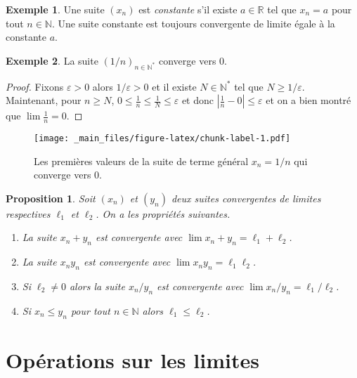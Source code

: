 \documentclass[
]{book}
\providecommand{\tightlist}{%
  \setlength{\itemsep}{0pt}\setlength{\parskip}{0pt}}
\newtheorem{proposition}{Proposition}[chapter]
\theoremstyle{definition}
\theoremstyle{definition}
\newtheorem{example}{Exemple}[chapter]
\theoremstyle{definition}
\theoremstyle{definition}
\theoremstyle{remark}
\begin{document}
\begin{example}
Une suite \((x_n)\) est \emph{constante} s'il existe \(a\in\mathbb{R}\) tel que \(x_n=a\) pour tout \(n\in\mathbb{N}\). Une suite constante est toujours convergente de limite égale à la constante \(a\).
\end{example}

\begin{example}
\protect\hypertarget{exm:harmonique}{}\label{exm:harmonique}La suite \((1/n)_{n\in\mathbb{N}^*}\) converge vers 0.
\end{example}

\begin{proof}
Fixons \(\varepsilon>0\) alors \(1/\varepsilon>0\) et il existe \(N\in\mathbb{N}^*\) tel que \(N\geq 1/\varepsilon\). Maintenant, pour \(n\geq N\), \(0\leq\frac{1}{n}\leq\frac{1}{N}\leq \varepsilon\) et donc \(\left|\frac{1}{n}-0\right|\leq\varepsilon\) et on a bien montré que \(\lim \frac{1}{n}=0\).
\end{proof}

\begin{figure}
\centering
\texttt{[image: \_main\_files/figure-latex/chunk-label-1.pdf]}
\caption{\label{fig:chunk-label}Les premières valeurs de la suite de terme général \(x_n=1/n\) qui converge vers 0.}
\end{figure}

\begin{proposition}

Soit \((x_n)\) et \((y_n)\) deux suites convergentes de limites respectives \(\ell_1\) et \(\ell_2\). On a les propriétés suivantes.

\begin{enumerate}
\def\labelenumi{\arabic{enumi}.}
\tightlist
\item
  La suite \(x_n+y_n\) est convergente avec \(\lim x_n+y_n=\ell_1+\ell_2\).
\item
  La suite \(x_ny_n\) est convergente avec \(\lim x_ny_n=\ell_1\ell_2\).
\item
  Si \(\ell_2\neq0\) alors la suite \(x_n/y_n\) est convergente avec \(\lim x_n/y_n=\ell_1/\ell_2\).
\item
  Si \(x_n\leq y_n\) pour tout \(n\in\mathbb{N}\) alors \(\ell_1\leq \ell_2\).
\end{enumerate}

\end{proposition}

\hypertarget{opuxe9rations-sur-les-limites}{%
\section{Opérations sur les limites}\label{opuxe9rations-sur-les-limites}}
\end{document}
